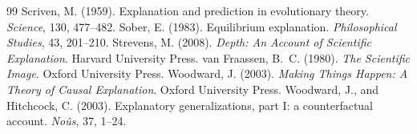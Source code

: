 \documentclass{situationist-preprint}
\begin{document}
\begin{thebibliography}{99}
 Scriven, M. (1959). Explanation and prediction in evolutionary theory. \emph{Science}, 130, 477--482.
 Sober, E. (1983). Equilibrium explanation. \emph{Philosophical Studies}, 43, 201--210.
 Strevens, M. (2008). \emph{Depth: An Account of Scientific Explanation}. Harvard University Press.
 van Fraassen, B.~C. (1980). \emph{The Scientific Image}. Oxford University Press.
 Woodward, J. (2003). \emph{Making Things Happen: A Theory of Causal Explanation}. Oxford University Press.
 Woodward, J., and Hitchcock, C. (2003). Explanatory generalizations, part I: a counterfactual account. \emph{No\^us}, 37, 1--24.
\end{thebibliography}
\end{document}
